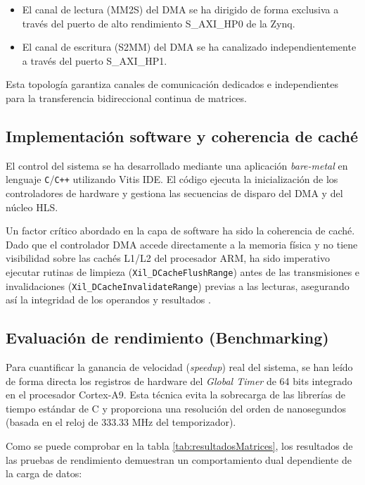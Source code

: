 \begin{itemize}
  \item El canal de lectura (\ac{MM2S}) del \ac{DMA} se ha dirigido de forma exclusiva a través del
    puerto de alto rendimiento S\_AXI\_HP0 de la Zynq.
  \item El canal de escritura (\ac{S2MM}) del \ac{DMA} se ha canalizado independientemente a través
    del puerto S\_AXI\_HP1.
\end{itemize}

Esta topología garantiza canales de comunicación dedicados e independientes para la
transferencia bidireccional continua de matrices.

\subsection{Implementación software y coherencia de caché}
El control del sistema se ha desarrollado mediante una aplicación \textit{bare-metal} en lenguaje
\texttt{C}/\texttt{C++} utilizando Vitis IDE. El código ejecuta la inicialización de los
controladores de
hardware y gestiona las secuencias de disparo del \ac{DMA} y del núcleo \ac{HLS}.

Un factor crítico abordado en la capa de software ha sido la coherencia de caché. Dado
que el controlador \ac{DMA} accede directamente a la memoria física y no tiene visibilidad
sobre las cachés L1/L2 del procesador \ac{ARM}, ha sido imperativo ejecutar rutinas de
limpieza (\texttt{Xil\_DCacheFlushRange}) antes de las transmisiones e invalidaciones
(\texttt{Xil\_DCacheInvalidateRange}) previas a las lecturas, asegurando así la integridad de los
operandos y resultados \citep{zynq7000Manual}.

\subsection{Evaluación de rendimiento (Benchmarking)}
Para cuantificar la ganancia de velocidad (\textit{speedup}) real del sistema, se han leído de
forma directa los registros de hardware del \textit{Global Timer} de 64 bits integrado en el
procesador Cortex-A9. Esta técnica evita la sobrecarga de las librerías de tiempo
estándar de C y proporciona una resolución del orden de nanosegundos (basada en el reloj
de 333.33 MHz del temporizador).

Como se puede comprobar en la tabla \ref{tab:resultadosMatrices}, los resultados de las pruebas
de rendimiento demuestran un comportamiento dual dependiente de la carga de datos:

